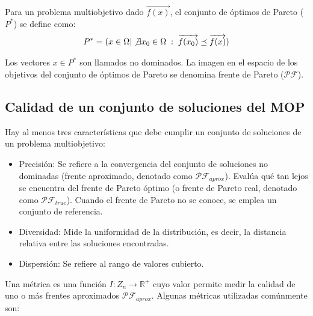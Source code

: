 \documentclass[letterpaper,10pt]{article}
\begin{document}
Para un problema multiobjetivo dado $\overrightarrow{f(x)}$, el conjunto de óptimos de Pareto ($P^*$) se define como:
$$P^* = ( x \in \Omega | \not\exists x_0 \in \Omega \; : \; \overrightarrow{f(x_0)} \preceq \overrightarrow{f(x)})$$
 
Los vectores $x \in P^*$ son llamados no dominados. La imagen en el espacio de los objetivos del conjunto de óptimos de Pareto se denomina frente de Pareto ($\mathcal{PF}$).
 
 
\subsection{Calidad de un conjunto de soluciones del MOP}
 
Hay al menos tres características que debe cumplir un conjunto de soluciones de un problema multiobjetivo:

\begin{itemize}
 \item Precisión: Se refiere a la convergencia del conjunto de soluciones no dominadas (frente aproximado, denotado como $\mathcal{PF}_{aprox}$). Evalúa qué tan lejos se encuentra del
frente de Pareto óptimo (o frente de Pareto real, denotado como $\mathcal{PF}_{true}$). Cuando el frente de Pareto no se conoce, se emplea un conjunto de referencia.

 \item Diversidad: Mide la uniformidad de la distribución, es decir, la distancia relativa entre las soluciones encontradas.

 \item Dispersión: Se refiere al rango de valores cubierto.
 
\end{itemize}

Una métrica es una función $I:Z_n \rightarrow \mathbb{R}^+$ cuyo valor permite medir la calidad de uno o más frentes aproximados $\mathcal{PF}_{aprox}$. Algunas métricas utilizadas comúnmente son:
\end{document}
